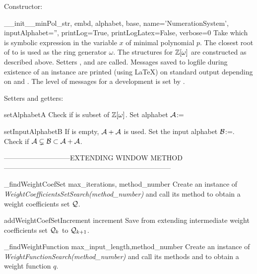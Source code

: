 Constructor:

\begin{method}{\_\_init\_\_}{minPol\_str, embd, alphabet, base, name='NumerationSystem', inputAlphabet='', printLog=True, printLogLatex=False, verbose=0}
Take  which is symbolic expression in the variable $x$ of minimal polynomial $p$. The closest root of   to  is used as the ring generator $\omega$. The structures for $\mathbb{Z}[\omega]$ are constructed as described above. Setters ,  and  are called. Messages saved to logfile during existence of an instance are printed (using \LaTeX) on standard output depending on  and . The level of messages for a development is set by . 
\end{method}

Setters and getters:

\begin{method}{setAlphabet}{A}
Check if  is subset of $\mathbb{Z}[\omega]$. Set alphabet $\mathcal{A}$:=
\end{method}

\begin{method}{setInputAlphabet}{B}
If  is empty, $\mathcal{A}+\mathcal{A}$ is used. Set the input alphabet $\mathcal{B}$:=. Check if $\mathcal{A}\subsetneq\mathcal{B}\subset\mathcal{A}+\mathcal{A}$. 
\end{method}


-----------------------------EXTENDING WINDOW METHOD------------------------------------------------------------------------

\begin{method}{\_findWeightCoefSet}{ max\_iterations, method\_number}
Create an instance of \emph{WeightCoefficientsSetSearch(method\_number)} and call its method  to obtain a weight coefficients set $\mathcal{Q}$.
\end{method}

\begin{method}{addWeightCoefSetIncrement}{ increment}
Save  from extending intermediate weight coefficients set $\mathcal{Q}_{k}$ to $\mathcal{Q}_{k+1}$.
\end{method}

\begin{method}{\_findWeightFunction}{ max\_input\_length,method\_number}
Create an instance of \emph{WeightFunctionSearch(method\_number)} and call its methods  and  to obtain a weight function $q$.
\end{method}


